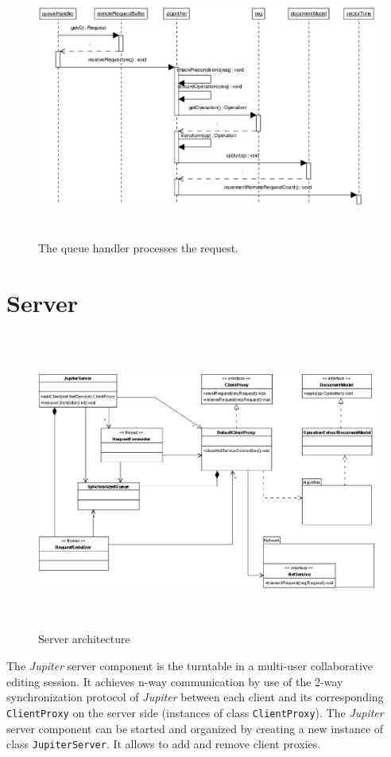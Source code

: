 \begin{figure}[H]
\centering
\includegraphics[height=8.71cm,width=14.76cm]{../../images/algo-impl/queuehandler_receive_request.eps}
\caption{The queue handler processes the request.}
\label{The queue handler processes the request.}
\end{figure}


\section{Server}
\begin{figure}[H]
\centering
\includegraphics[height=9.8cm,width=15.36cm]{../../images/algo-impl/server_diagram.eps}
\caption{Server architecture}
\label{Server architecture}
\end{figure}

The \emph{Jupiter} server component is the turntable in a multi-user collaborative editing session. It achieves n-way communication by use of the 2-way synchronization protocol of \emph{Jupiter} between each client and its corresponding \texttt{ClientProxy} on the server side (instances of class \texttt{ClientProxy}). The \emph{Jupiter} server component can be started and organized by creating a new instance of class \texttt{JupiterServer}. It allows to add and remove client proxies.

